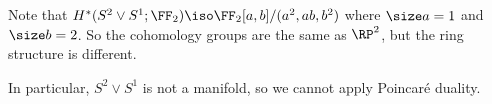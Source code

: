 \documentclass{standalone}
\begin{document}
\begin{remark}
  Note that
  \(H^*(S^2 \vee S^1; \FF_2) \iso \FF_2[a, b]/(a^2, ab, b^2)\)
  where \(\size a = 1\) and \(\size b = 2\).
  So the cohomology groups are the same as \(\RP^2\),
  but the ring structure is different.

  In particular, \(S^2 \vee S^1\) is not a manifold,
  so we cannot apply Poincar\'e duality.
\end{remark}
\end{document}
